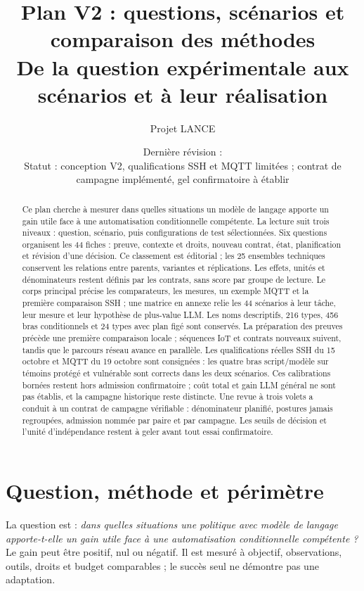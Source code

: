 \documentclass[11pt,a4paper]{article}
\title{Plan V2 : questions, scénarios et comparaison des méthodes\\[4pt]\large De la question expérimentale aux scénarios et à leur réalisation}
\author{Projet LANCE}
\date{Dernière révision : \rev\\Statut : conception V2, qualifications SSH et MQTT limitées ; contrat de campagne implémenté, gel confirmatoire à établir}
\begin{document}
\maketitle
\begin{abstract}
Ce plan cherche à mesurer dans quelles situations un modèle de langage apporte un gain utile face à une automatisation conditionnelle compétente. La lecture suit trois niveaux : question, scénario, puis configurations de test sélectionnées. Six questions organisent les 44 fiches : preuve, contexte et droits, nouveau contrat, état, planification et révision d’une décision. Ce classement est éditorial ; les 25 ensembles techniques conservent les relations entre parents, variantes et réplications. Les effets, unités et dénominateurs restent définis par les contrats, sans score par groupe de lecture. Le corps principal précise les comparateurs, les mesures, un exemple MQTT et la première comparaison SSH ; une matrice en annexe relie les 44 scénarios à leur tâche, leur mesure et leur hypothèse de plus-value LLM. Les noms descriptifs, 216 types, 456 bras conditionnels et 24 types avec plan figé sont conservés. La préparation des preuves précède une première comparaison locale ; séquences IoT et contrats nouveaux suivent, tandis que le parcours réseau avance en parallèle. Les qualifications réelles SSH du 15 octobre et MQTT du 19 octobre sont consignées : les quatre bras script/modèle sur témoins protégé et vulnérable sont corrects dans les deux scénarios. Ces calibrations bornées restent hors admission confirmatoire ; coût total et gain LLM général ne sont pas établis, et la campagne historique reste distincte. Une revue à trois volets a conduit à un contrat de campagne vérifiable : dénominateur planifié, postures jamais regroupées, admission nommée par paire et par campagne. Les seuils de décision et l'unité d'indépendance restent à geler avant tout essai confirmatoire.
\end{abstract}
\setcounter{tocdepth}{1}
{\small\setlength{\parskip}{0pt}\tableofcontents}
\clearpage

\section{Question, méthode et périmètre}\label{sec:method}
La question est : \emph{dans quelles situations une politique avec modèle de langage apporte-t-elle un gain utile face à une automatisation conditionnelle compétente ?} Le gain peut être positif, nul ou négatif. Il est mesuré à objectif, observations, outils, droits et budget comparables ; le succès seul ne démontre pas une adaptation.
\end{document}
